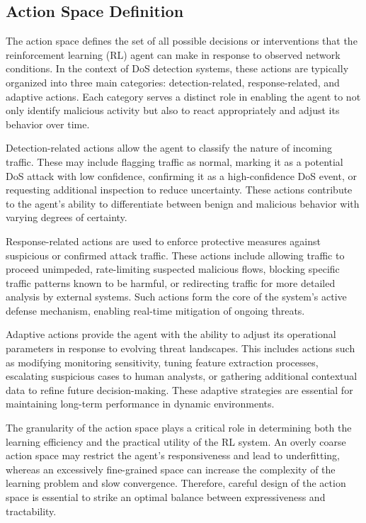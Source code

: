 \documentclass{report}
\begin{document}
\subsection{Action Space Definition}

The action space defines the set of all possible decisions or interventions that the reinforcement learning (RL) agent can make in response to observed network conditions. In the context of DoS detection systems, these actions are typically organized into three main categories: detection-related, response-related, and adaptive actions. Each category serves a distinct role in enabling the agent to not only identify malicious activity but also to react appropriately and adjust its behavior over time.

Detection-related actions allow the agent to classify the nature of incoming traffic. These may include flagging traffic as normal, marking it as a potential DoS attack with low confidence, confirming it as a high-confidence DoS event, or requesting additional inspection to reduce uncertainty. These actions contribute to the agent’s ability to differentiate between benign and malicious behavior with varying degrees of certainty.

Response-related actions are used to enforce protective measures against suspicious or confirmed attack traffic. These actions include allowing traffic to proceed unimpeded, rate-limiting suspected malicious flows, blocking specific traffic patterns known to be harmful, or redirecting traffic for more detailed analysis by external systems. Such actions form the core of the system's active defense mechanism, enabling real-time mitigation of ongoing threats.

Adaptive actions provide the agent with the ability to adjust its operational parameters in response to evolving threat landscapes. This includes actions such as modifying monitoring sensitivity, tuning feature extraction processes, escalating suspicious cases to human analysts, or gathering additional contextual data to refine future decision-making. These adaptive strategies are essential for maintaining long-term performance in dynamic environments.

The granularity of the action space plays a critical role in determining both the learning efficiency and the practical utility of the RL system. An overly coarse action space may restrict the agent's responsiveness and lead to underfitting, whereas an excessively fine-grained space can increase the complexity of the learning problem and slow convergence. Therefore, careful design of the action space is essential to strike an optimal balance between expressiveness and tractability.
\end{document}

